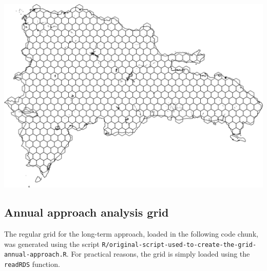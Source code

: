 \documentclass[10pt,landscape,a3paper]{article}
\begin{document}
\begin{center}\includegraphics{img/data-download-preparation-eda/regular-grid-1} \end{center}

\hypertarget{annual-approach-analysis-grid}{%
\subsection{Annual approach analysis
grid}\label{annual-approach-analysis-grid}}

The regular grid for the long-term approach, loaded in the following
code chunk, was generated using the script
\texttt{R/original-script-used-to-create-the-grid-annual-approach.R}.
For practical reasons, the grid is simply loaded using the
\texttt{readRDS} function.
\end{document}
